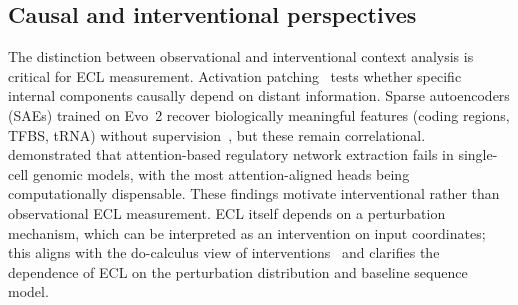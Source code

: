 \subsection{Causal and interventional perspectives}

The distinction between observational and interventional context analysis is critical for ECL measurement. Activation patching~\citep{Geiger2025CausalAbstraction} tests whether specific internal components causally depend on distant information. Sparse autoencoders (SAEs) trained on Evo~2 recover biologically meaningful features (coding regions, TFBS, tRNA) without supervision~\citep{Goodfire2025Evo2}, but these remain correlational. \citet{Kendiukhov2026MechInterp} demonstrated that attention-based regulatory network extraction fails in single-cell genomic models, with the most attention-aligned heads being computationally dispensable. These findings motivate interventional rather than observational ECL measurement. ECL itself depends on a perturbation mechanism, which can be interpreted as an intervention on input coordinates; this aligns with the do-calculus view of interventions~\citep{Pearl2009Causality} and clarifies the dependence of ECL on the perturbation distribution and baseline sequence model.
